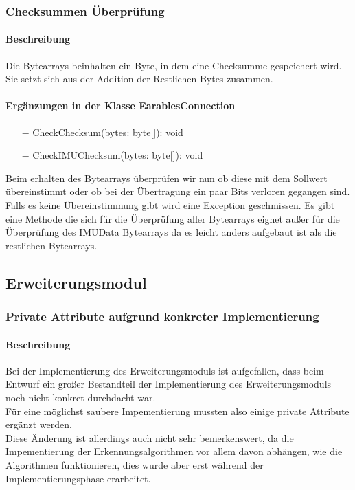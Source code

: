 \documentclass[a4paper,12pt]{article}
\begin{document}
\subsubsection{Checksummen Überprüfung}
\paragraph{Beschreibung}
Die Bytearrays beinhalten ein Byte, in dem eine Checksumme gespeichert wird. Sie setzt sich aus der Addition der Restlichen Bytes zusammen. 

\paragraph{Ergänzungen in der Klasse EarablesConnection}
\begin{itemize}
	\item[$-$] CheckChecksum(bytes: byte[]): void
	\item[$-$] CheckIMUChecksum(bytes: byte[]): void
\end{itemize}
Beim erhalten des Bytearrays überprüfen wir nun ob diese mit dem Sollwert übereinstimmt oder ob bei der Übertragung ein paar Bits verloren gegangen sind. Falls es keine Übereinstimmung gibt wird eine Exception geschmissen. Es gibt eine Methode die sich für die Überprüfung aller Bytearrays eignet außer für die Überprüfung des IMUData Bytearrays da es leicht anders aufgebaut ist als die restlichen Bytearrays.

\subsection{Erweiterungsmodul}


\subsubsection{Private Attribute aufgrund konkreter Implementierung}
\paragraph{Beschreibung}
Bei der Implementierung des Erweiterungsmoduls ist aufgefallen, dass beim Entwurf ein großer Bestandteil der Implementierung des Erweiterungsmoduls noch nicht konkret durchdacht war.\\
Für eine möglichst saubere Impementierung mussten also einige private Attribute ergänzt werden.\\ 
Diese Änderung ist allerdings auch nicht sehr bemerkenswert, da die Impementierung der Erkennungsalgorithmen vor allem davon abhängen, wie die Algorithmen funktionieren, dies wurde aber erst während der Implementierungsphase erarbeitet. \\
\end{document}
